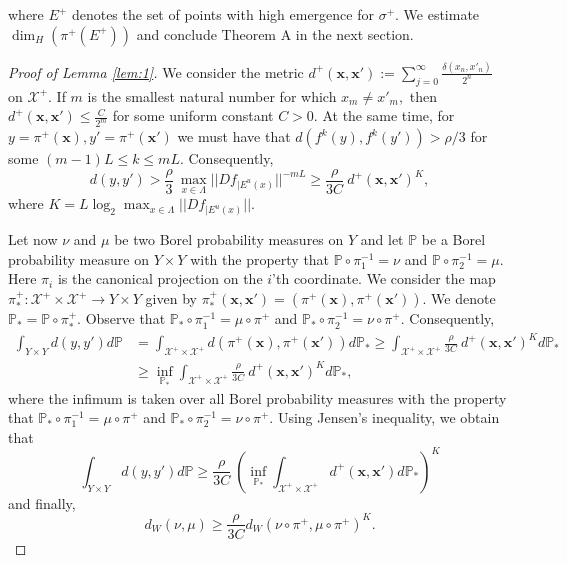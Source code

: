 \documentclass{amsart}
\theoremstyle{plain}
\theoremstyle{definition}
\theoremstyle{remark}
\numberwithin{equation}{section}
\begin{document}
where $E^+$ denotes the set of points with high emergence for $\sigma^+$. We estimate $\dim_H  (\pi^+(E^+))$ and conclude Theorem A in the next section.

\begin{proof}[Proof of Lemma \ref{lem:1}]
We consider the metric $d^+(\textbf{x},\textbf{x}'):=\sum_{j=0}^{\infty} \frac{\delta(x_n,x'_n)}{2^n}$ on $\mathcal{X}^+$.
If $m$ is the smallest natural number for which $x_m\neq x'_m,$ then $d^+(\textbf{x},\textbf{x}')\leq \frac{C}{2^m}$ for some uniform constant $C>0$.
At the same time, for $y= \pi^+(\textbf{x}), y'=\pi^+(\textbf{x}')$ we must have that $d(f^k(y),f^k(y'))>\rho/3$ for some $(m-1)L \leq k\leq mL$.
Consequently, 
$$   d(y,y' )  >  \frac{\rho}{3} ~ \max_{x\in\Lambda}||  Df_{| E^u(x)}||^{-mL}  \geq \frac{\rho}{3C}~   d^+(\textbf{x},\textbf{x}')^K, $$
 where  $K= L \log_2 \max_{x\in\Lambda}||Df_{| E^u(x)}||.$    

Let now $\nu$ and $\mu$ be two Borel probability measures on $Y$ and let $\mathbb{P}$ be a Borel probability measure on $Y\times Y$ with the property that
$\mathbb{P}\circ \pi_1^{-1} = \nu$ and $\mathbb{P}\circ \pi_2^{-1} = \mu$. Here $\pi_i$ is the canonical projection on the $i$'th coordinate.
We consider the map $\pi^+_*: \mathcal{X}^+\times \mathcal{X}^+ \to Y \times Y$ given by $\pi^+_*(\textbf{x},\textbf{x}')= (\pi^+(\textbf{x}),\pi^+(\textbf{x}')).$
We denote $\mathbb{P}_*= \mathbb{P}\circ \pi^+_*$.
Observe that $\mathbb{P}_*\circ \pi_1^{-1} = \mu\circ \pi^+$ and  $\mathbb{P}_*\circ \pi_2^{-1} = \nu\circ \pi^+$.
Consequently,
\begin{align*}
\int_{Y\times Y} d(y,y') d\mathbb{P}& = \int_{\mathcal{X}^+\times \mathcal{X}^+}     d(\pi^+(\textbf{x}),\pi^+(\textbf{x}'))   d\mathbb{P}_*  \geq     \int_{\mathcal{X}^+\times \mathcal{X}^+}      \frac{\rho}{3C}~   d^+(\textbf{x},\textbf{x}')^K   d\mathbb{P}_*   \\
&\geq     \inf_{\mathbb{P}_* }   \int_{\mathcal{X}^+\times \mathcal{X}^+}     \frac{\rho}{3C}~   d^+(\textbf{x},\textbf{x}')^K   d\mathbb{P}_*   ,   
\end{align*}
where the infimum is taken over all Borel probability measures with the property that $\mathbb{P}_*\circ \pi_1^{-1} = \mu\circ \pi^+$ and  $\mathbb{P}_*\circ \pi_2^{-1} = \nu\circ \pi^+$.
Using Jensen's inequality, we obtain that
$$   \int_{Y\times Y} d(y,y') d\mathbb{P}    \geq     \frac{\rho}{3C}~ \left( \inf_{\mathbb{P}_* }   \int_{\mathcal{X}^+\times \mathcal{X}^+}      d^+(\textbf{x},\textbf{x}')   d\mathbb{P}_*   \right)^K  $$
and finally,
$$    d_W(\nu,\mu) \geq  \frac{\rho}{3C} d_W( \nu\circ \pi^+, \mu\circ \pi^+)^K.$$



\end{proof}
\end{document}
